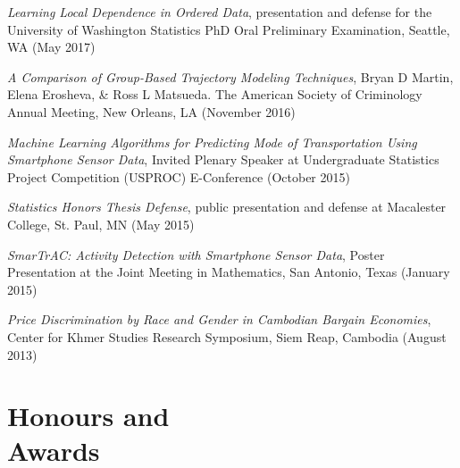 \documentclass[margin,centered]{res}
\begin{document}
\begin{resume}
\emph{Learning Local Dependence in Ordered Data}, presentation and defense for the University of Washington Statistics PhD Oral Preliminary Examination, Seattle, WA (May 2017)

\emph{A Comparison of Group-Based Trajectory Modeling Techniques}, Bryan D Martin, Elena Erosheva, \& Ross L Matsueda. The American Society of Criminology Annual Meeting, New Orleans, LA (November 2016)

\emph{Machine Learning Algorithms for Predicting Mode of Transportation Using Smartphone Sensor Data}, Invited Plenary Speaker at Undergraduate Statistics Project Competition (USPROC) E-Conference (October 2015)

\emph{Statistics Honors Thesis Defense}, public presentation and defense at Macalester College, St. Paul, MN (May 2015)

\emph{SmarTrAC: Activity Detection with Smartphone Sensor Data}, Poster Presentation at the Joint Meeting in Mathematics, San Antonio, Texas (January 2015)

\emph{Price Discrimination by Race and Gender in Cambodian Bargain Economies}, Center for Khmer Studies Research Symposium, Siem Reap, Cambodia (August 2013)



\section{\sc Honours and\\ Awards}


\end{resume}
\end{document}
